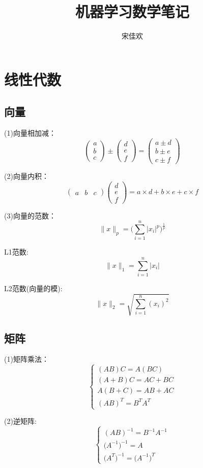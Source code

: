 \documentclass[UTF8]{ctexart} %
\title{机器学习数学笔记}
\author{宋佳欢}
\begin{document}
	\maketitle
	\tableofcontents
	\songti {}
	
	\section{线性代数}
		\subsection{向量}
		(1)向量相加减：
		\[\begin{pmatrix}a\\b\\c\end{pmatrix}  \pm \begin{pmatrix}d\\e\\f\end{pmatrix}
		=\begin{pmatrix}a\pm d\\b\pm e\\c\pm f\end{pmatrix}\]
		
		(2)向量内积：\[\begin{pmatrix}a&b&c\end{pmatrix} \begin{pmatrix}d\\e\\f\end{pmatrix}
		=a\times d+b\times e+c\times f\]
		
		(3)向量的范数：\[\|x\|_p=\Big(\sum_{i=1}^n|x_i|^p\Big)^\frac{1}{p}\]
		
		\quad \quad L1范数:  \[\|x\|_1=\sum_{i=1}^n|x_i|\]
		
		\quad \quad L2范数(向量的模):  \[\|x\|_2=\sqrt{\sum_{i=1}^n(x_i)^2}\]
		
		\subsection{矩阵}
		(1)矩阵乘法：
		\[\begin{cases}
			(AB)C=A(BC)\\
			(A+B)C=AC+BC\\
			A(B+C)=AB+AC\\
			(AB)^T=B^TA^T
		\end{cases}\]
		
		(2)逆矩阵:
		\[\begin{cases}
		(AB)^{-1}=B^{-1}A^{-1}\\
		\big(A^{-1}\big)^{-1}=A\\
		\big(A^T\big)^{-1}=\big(A^{-1}\big)^T
		\end{cases}\]
		
\end{document}
